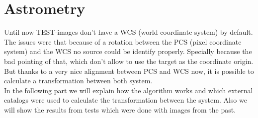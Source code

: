 \section{Astrometry}
Until now TEST-images don't have a WCS (world coordinate system) by default. The issues were that because of a rotation between the PCS (pixel coordinate system) and the WCS no source could be identify properly. Specially because the bad pointing of that, which don't allow to use the target as the coordinate origin. But thanks to a very nice alignment between PCS and WCS now, it is possible to calculate a transformation between both system. \\
In the following part we will explain how the algorithm works and which external catalogs were used to calculate the transformation between the system. Also we will show the results from tests which were done with images from the past.

